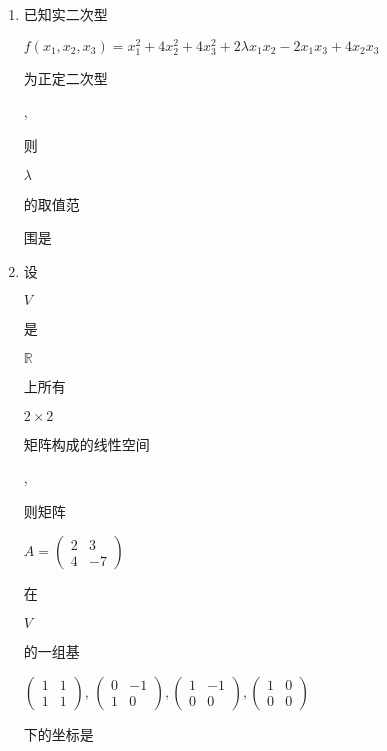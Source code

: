 \documentclass[10pt]{article}
\begin{document}
\begin{enumerate}
  \item \begin{CJK}{UTF8}{mj}已知实二次型\end{CJK} $f\left(x_{1}, x_{2}, x_{3}\right)=x_{1}^{2}+4 x_{2}^{2}+4 x_{3}^{2}+2 \lambda x_{1} x_{2}-2 x_{1} x_{3}+4 x_{2} x_{3}$ \begin{CJK}{UTF8}{mj}为正定二次型\end{CJK}, \begin{CJK}{UTF8}{mj}则\end{CJK} $\lambda$ \begin{CJK}{UTF8}{mj}的取值范\end{CJK} \begin{CJK}{UTF8}{mj}围是\end{CJK}

  \item \begin{CJK}{UTF8}{mj}设\end{CJK} $V$ \begin{CJK}{UTF8}{mj}是\end{CJK} $\mathbb{R}$ \begin{CJK}{UTF8}{mj}上所有\end{CJK} $2 \times 2$ \begin{CJK}{UTF8}{mj}矩阵构成的线性空间\end{CJK}, \begin{CJK}{UTF8}{mj}则矩阵\end{CJK} $A=\left(\begin{array}{cc}2 & 3 \\ 4 & -7\end{array}\right)$ \begin{CJK}{UTF8}{mj}在\end{CJK} $V$ \begin{CJK}{UTF8}{mj}的一组基\end{CJK} $\left(\begin{array}{cc}1 & 1 \\ 1 & 1\end{array}\right)$, $\left(\begin{array}{cc}0 & -1 \\ 1 & 0\end{array}\right),\left(\begin{array}{cc}1 & -1 \\ 0 & 0\end{array}\right),\left(\begin{array}{cc}1 & 0 \\ 0 & 0\end{array}\right)$ \begin{CJK}{UTF8}{mj}下的坐标是\end{CJK}

\end{enumerate}
\end{document}
